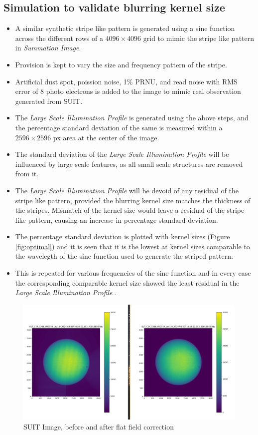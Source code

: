 \documentclass[11pt,a4paper]{article}
\begin{document}
	\subsection{Simulation to validate blurring kernel size}
	\begin{itemize}
		\item A similar synthetic stripe like pattern is generated using a sine function across the different rows of a $4096 \times 4096$ grid to mimic the stripe like pattern in \textit{Summation Image}.
		\item Provision is kept to vary the size and frequency pattern of the stripe.
		\item Artificial dust spot, poission noise, 1\% PRNU, and read noise with RMS error of 8 photo electrons is added to the image to mimic real observation generated from SUIT.
		\item The \textit{Large Scale Illumination Profile} is generated using the above steps, and the percentage standard deviation of the same is measured within a $2596 \times 2596$ px area at the center of the image.
		\item The standard deviation of the \textit{Large Scale Illumination Profile} will be influenced by large scale features, as all small scale structures are removed from it.
		\item The \textit{Large Scale Illumination Profile} will be devoid of any residual of the stripe like pattern, provided the blurring kernel size matches the thickness of the stripes. Mismatch of the kernel size would leave a residual of the stripe like pattern, causing an increase in percentage standard deviation.
		\item The percentage standard deviation is plotted with kernel sizes (Figure \ref{fig:optimal}) and it is seen that it is the lowest at kernel sizes comparable to the wavelegth of the sine function used to generate the striped pattern.
		\item This is repeated for various frequencies of the sine function and in every case the corresponding comparable kernel size showed the least residual in the \textit{Large Scale Illumination Profile} .
	\end{itemize}
	
	\begin{figure}
		\centering
		\includegraphics[width=0.7\linewidth]{pics/screenshot_2024-06-06_12-24-27}
		\caption{SUIT Image, before and after flat field correction}
		\label{fig:compare}
	\end{figure}
	
\end{document}
